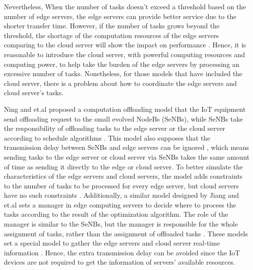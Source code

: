 \documentclass[a4paper,11pt]{article}
\begin{document}
Nevertheless, When the number of tasks doesn't exceed a threshold based on the number of edge servers, the edge servers can provide better service due to the shorter transfer time. However, if the number of tasks grows beyond the threshold, the shortage of the computation resources of the edge servers comparing to the cloud server will show the impact on performance \cite{A_Cooperative_Partial_Computation_Offloading_Scheme_for_Mobile_Edge}. Hence, it is reasonable to introduce the cloud server, with powerful computing resources and computing power, to help take the burden of the edge servers by processing an excessive number of tasks. Nonetheless, for those models that have included the cloud server, there is a problem about how to coordinate the edge servers and cloud server's tasks. \newline

Ning and et.al proposed a computation offloading model that the IoT equipment send offloading request to the small evolved NodeBs (SeNBs), while SeNBs take the responsibility of offloading tasks to the edge server or the cloud server according to schedule algorithms \cite{A_Cooperative_Partial_Computation_Offloading_Scheme_for_Mobile_Edge}. This model also supposes that the transmission delay between SeNBs and edge servers can be ignored \cite{A_Cooperative_Partial_Computation_Offloading_Scheme_for_Mobile_Edge}, which means sending tasks to the edge server or cloud server via SeNBs takes the same amount of time as sending it directly to the edge or cloud server. To better simulate the characteristics of the edge servers and cloud servers, the model adds constraints to the number of tasks to be processed for every edge server, but cloud servers have no such constraints \cite{A_Cooperative_Partial_Computation_Offloading_Scheme_for_Mobile_Edge}. Additionally, a similar model designed by Jiang and et.al sets a manager in edge computing servers to decide where to process the tasks according to the result of the optimization algorithm. The role of the manager is similar to the SeNBs, but the manager is responsible for the whole assignment of tasks, rather than the assignment of offloaded tasks \cite{cloud_3_edgemanager}. These models set a special model to gather the edge servers and cloud server real-time information \cite{A_Cooperative_Partial_Computation_Offloading_Scheme_for_Mobile_Edge}. Hence, the extra transmission delay can be avoided since the IoT devices are not required to get the information of servers' available resources. \newline
\end{document}
